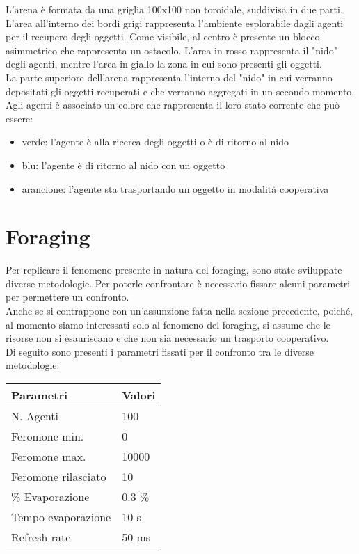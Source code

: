 \documentclass[12pt,a4paper,openright,twoside]{report}
\begin{document}
L'arena è formata da una griglia 100x100 non toroidale, suddivisa in due parti.\\
L'area all'interno dei bordi grigi rappresenta l'ambiente esplorabile dagli agenti per il recupero degli oggetti. Come visibile, al centro è presente un blocco asimmetrico che rappresenta un ostacolo. L'area in rosso rappresenta il "nido" degli agenti, mentre l'area in giallo la zona in cui sono presenti gli oggetti.\\
La parte superiore dell'arena rappresenta l'interno del "nido" in cui verranno depositati gli oggetti recuperati e che verranno aggregati in un secondo momento.\\
Agli agenti è associato un colore che rappresenta il loro stato corrente che può essere:

\begin{itemize}
	\item verde: l'agente è alla ricerca degli oggetti o è di ritorno al nido
	\item blu: l'agente è di ritorno al nido con un oggetto
	\item arancione: l'agente sta trasportando un oggetto in modalità cooperativa
\end{itemize}

\section{Foraging}

Per replicare il fenomeno presente in natura del foraging, sono state sviluppate diverse metodologie. Per poterle confrontare è necessario fissare alcuni parametri per permettere un confronto.\\
Anche se si contrappone con un'assunzione fatta nella sezione precedente, poiché, al momento siamo interessati solo al fenomeno del foraging, si assume che le risorse non si esauriscano e che non sia necessario un trasporto cooperativo.\\
Di seguito sono presenti i parametri fissati per il confronto tra le diverse metodologie:\\

\begin{tabular}{p{5cm}|p{5cm}} 
	 \textbf{ Parametri} & \textbf{ Valori} \\ \hline
	 N. Agenti & 100 \\
	 Feromone min. & 0 \\
	 Feromone max. & 10000 \\
	 Feromone rilasciato & 10\\
	 \% Evaporazione & 0.3 \% \\
	 Tempo evaporazione & 10 s \\
	 Refresh rate & 50 ms 
\end{tabular}
\\
\end{document}
